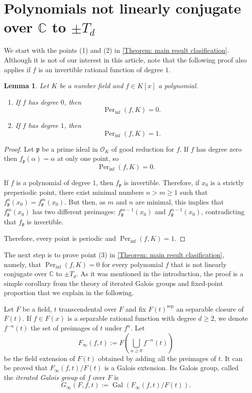 \documentclass{amsart}
\def\OK{\mathcal{O}_K}
\def\CC{\mathbb C}
\DeclareMathOperator{\Gal}{Gal}
\DeclareMathOperator{\Per}{Per}
\newtheorem{lemma}[proposition]{Lemma}
\theoremstyle{definition}
\begin{document}
\section{Polynomials not linearly conjugate over $\CC$ to $\pm T_d$} 
\label{section: Polynomials not linearly conjugate over C to T_d}

We start with the points (1) and (2) in \cref{Theorem: main result clasification}. Although it is not of our interest in this article, note that the following proof also applies if $f$ is an invertible rational function of degree $1$.

\begin{lemma}
\label{lemma: case degree 1}
Let $K$ be a number field and $f \in K[x]$ a polynomial. 
\begin{enumerate}
\item If $f$ has degree $0$, then $$\Per_{\inf}(f,K) = 0.$$ 
\item If $f$ has degree $1$, then $$\Per_{\inf}(f,K) = 1.$$  
\end{enumerate}
\end{lemma}

\begin{proof}
Let $\mathfrak{p}$ be a prime ideal in $\OK$ of good reduction for $f$. If $f$ has degree zero then $f_\mathfrak{p}(\alpha) = \alpha$ at only one point, so $$\Per_{\inf}(f,K) = 0.$$

If $f$ is a polynomial of degree $1$, then $f_\mathfrak{p}$ is invertible. Therefore, if $x_0$ is a strictly preperiodic point, there exist minimal numbers $n > m \geq 1$ such that $f_\mathfrak{p}^n(x_0) = f_\mathfrak{p}^m(x_0)$. But then, as $m$ and $n$ are minimal, this implies that $f_\mathfrak{p}^m(x_0)$ has two different preimages: $f_\mathfrak{p}^{m-1}(x_0)$ and $f_\mathfrak{p}^{n-1}(x_0)$, contradicting that $f_\mathfrak{p}$ is invertible. 

Therefore, every point is periodic and $\Per_{\inf}(f,K) = 1$.
\end{proof}

The next step is to prove point (3) in \cref{Theorem: main result clasification}, namely, that $\Per_{\inf}(f,K) = 0$ for every polynomial $f$ that is not linearly conjugate over $\CC$ to $\pm T_d$. As it was mentioned in the introduction, the proof is a simple corollary from the theory of iterated Galois groups and fixed-point proportion that we explain in the following.

Let $F$ be a field, $t$ transcendental over $F$ and fix $F(t)^{\mathrm{sep}}$ an separable closure of $F(t)$. If $f \in F(x)$ is a separable rational function with degree $d \geq 2$, we denote $f^{-n}(t)$ the set of preimages of $t$ under $f^n$. Let $$F_\infty(f,t) := F \left(\bigcup_{n \geq 0} f^{-n}(t) \right)$$ be the field extension of $F(t)$ obtained by adding all the preimages of $t$. It can be proved that $F_\infty(f,t)/F(t)$ is a Galois extension. Its Galois group, called the \textit{iterated Galois group} of $f$ over $F$ is $$G_\infty(F,f,t) := \Gal(F_\infty(f,t)/F(t)).$$
\end{document}
